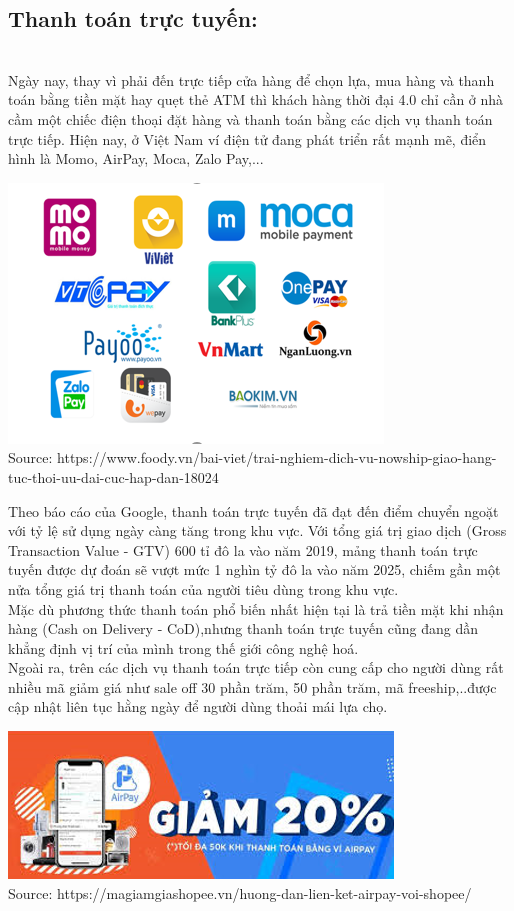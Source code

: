 \documentclass[13pt,a4paper]{article}
\begin{document}
    \subsection{Thanh toán trực tuyến:}\\
    Ngày nay, thay vì phải đến trực tiếp cửa hàng để chọn lựa, mua hàng và thanh toán bằng tiền mặt hay quẹt thẻ ATM thì khách hàng thời đại 4.0 chỉ cần ở nhà cầm một chiếc điện thoại đặt hàng và thanh toán bằng các dịch vụ thanh toán trực tiếp.
    Hiện nay, ở Việt Nam ví điện tử đang phát triển rất mạnh mẽ, điển hình là Momo, AirPay, Moca, Zalo Pay,...
    \begin{center}
    \includegraphics[scale=1]{images/vi.png} \\
    \fontsize{10pt}{1.2pt}\selectfont
    Source: https://www.foody.vn/bai-viet/trai-nghiem-dich-vu-nowship-giao-hang-tuc-thoi-uu-dai-cuc-hap-dan-18024
    \end{center}
    Theo báo cáo của Google, thanh toán trực tuyến đã đạt đến điểm chuyển ngoặt với tỷ lệ sử dụng ngày càng tăng trong khu vực. Với tổng giá trị giao dịch (Gross Transaction Value - GTV) 600 tỉ đô la vào năm 2019, mảng thanh toán trực tuyến được dự đoán sẽ vượt mức 1 nghìn tỷ đô la vào năm 2025, chiếm gần một nửa tổng giá trị thanh toán của người tiêu dùng trong khu vực. \\
    Mặc dù phương thức thanh toán phổ biến nhất hiện tại là trả tiền mặt khi nhận hàng (Cash on Delivery - CoD),nhưng thanh toán trực tuyến cũng đang dần khẳng định vị trí của mình trong thế giới công nghệ hoá. \\
    Ngoài ra, trên các dịch vụ thanh toán trực tiếp còn cung cấp cho người dùng rất nhiều mã giảm giá như sale off 30 phần trăm, 50 phần trăm, mã freeship,..được cập nhật liên tục hằng ngày để người dùng thoải mái lựa chọ.
    \begin{center}
    \includegraphics[scale=0.9]{images/giam.png} \\
    \fontsize{10pt}{1.2pt}\selectfont
    Source: https://magiamgiashopee.vn/huong-dan-lien-ket-airpay-voi-shopee/
    \end{center}
\end{document}
